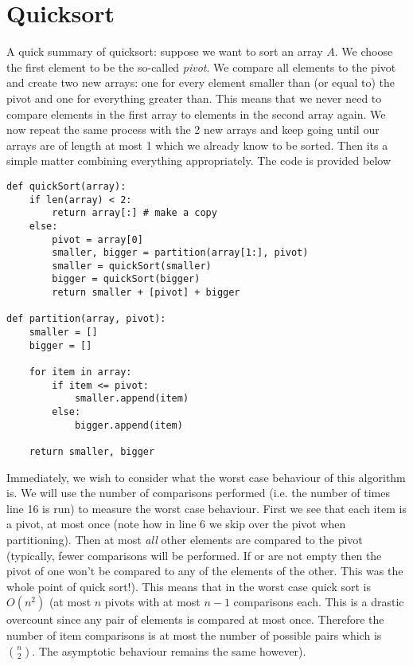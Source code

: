 \section{Quicksort}
A quick summary of quicksort: suppose we want to sort an array $A$. We choose the first element to be the so-called \textit{pivot}. We compare all elements to the pivot and create two new arrays: one for every element smaller than (or equal to) the pivot and one for everything greater than. This means that we never need to compare elements in the first array to elements in the second array again. We now repeat the same process with the 2 new arrays and keep going until our arrays are of length at most 1 which we already know to be sorted. Then its a simple matter combining everything appropriately. The code is provided below
\begin{lstlisting}
def quickSort(array):
    if len(array) < 2:
        return array[:] # make a copy
    else:
        pivot = array[0]
        smaller, bigger = partition(array[1:], pivot)
        smaller = quickSort(smaller)
        bigger = quickSort(bigger)
        return smaller + [pivot] + bigger

def partition(array, pivot):
    smaller = []
    bigger = []
    
    for item in array:
        if item <= pivot:
            smaller.append(item)
        else:
            bigger.append(item)
    
    return smaller, bigger
\end{lstlisting}

Immediately, we wish to consider what the worst case behaviour of this algorithm is. We will use the number of comparisons performed (i.e. the number of times line 16 is run) to measure the worst case behaviour. First we see that each item is a pivot, at most once (note how in line 6 we skip over the pivot when partitioning). Then at most \textit{all} other elements are compared to the pivot (typically, fewer comparisons will be performed. If  or  are not empty then the pivot of one won't be compared to any of the elements of the other. This was the whole point of quick sort!). This means that in the worst case quick sort is $O(n^2)$ (at most $n$ pivots with at most $n - 1$ comparisons each. This is a drastic overcount since any pair of elements is compared at most once. Therefore the number of item comparisons is at most the number of possible pairs which is $\binom{n}{2}$. The asymptotic behaviour remains the same however). 


